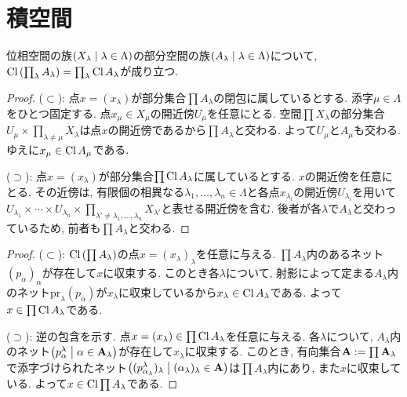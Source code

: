\documentclass[uplatex, dvipdfmx, a4paper, 12pt, class=jsbook, crop=false]{standalone}
\begin{document}
\section{積空間}
\label{sec:product-spaces}

\newcommand{\directedA}{\mathbf{A}} %
\newcommand{\proj}{\mathrm{pr}} %

\begin{proposition}
	\label{02b3a9}
	位相空間の族$\setfamily{X_\lambda}{\lambda \in \Lambda}$の部分空間の族$\setfamily{A_\lambda}{\lambda \in \Lambda}$について, $ \mathop{\mathrm{Cl}}\nolimits \left(\prod_\lambda A_\lambda\right) = \prod_\lambda \mathop{\mathrm{Cl}}\nolimits A_\lambda $が成り立つ.
\end{proposition}

\begin{proof}
	($\subset$):
	点$x = (x_\lambda)$が部分集合$\prod A_\lambda$の閉包に属しているとする.
	添字$\mu \in \Lambda$をひとつ固定する.
	点$x_\mu \in X_\mu$の開近傍$U_\mu$を任意にとる.
	空間$\prod X_\lambda$の部分集合$U_\mu \times \prod_{\lambda \neq \mu} X_{\lambda}$は点$x$の開近傍であるから$\prod A_{\lambda}$と交わる.
	よって$U_\mu$と$A_\mu$も交わる. ゆえに$x_\mu \in \mathop{\mathrm{Cl}}\nolimits A_\mu$である.

	($\supset$):
	点$x = (x_\lambda)$が部分集合$\prod \mathop{\mathrm{Cl}}\nolimits A_\lambda$に属しているとする.
	$x$の開近傍を任意にとる.
	その近傍は, 有限個の相異なる$\lambda_1, \ldots, \lambda_n \in \Lambda$と各点$x_{\lambda_i}$の開近傍$U_{\lambda_i}$を用いて$U_{\lambda_1} \times \cdots \times U_{\lambda_n} \times \prod_{\lambda' \neq \lambda_1, \ldots, \lambda_n} X_{\lambda'}$と表せる開近傍を含む.
	後者が各$\lambda$で$A_\lambda$と交わっているため, 前者も$\prod A_\lambda$と交わる.
\end{proof}

\begin{proof}
	($\subset$):
	$\mathop{\mathrm{Cl}}\nolimits \left(\prod A_\lambda\right)$の点$x = (x_\lambda)_\lambda$を任意に与える.
	$\prod A_\lambda$内のあるネット$(p_\alpha)_\alpha$が存在して$x$に収束する.
	このとき各$\lambda$について, 射影によって定まる$A_\lambda$内のネット$\proj_\lambda (p_\alpha)$が$x_\lambda$に収束しているから$x_\lambda \in \mathop{\mathrm{Cl}}\nolimits A_\lambda$である.
	よって$x \in \prod \mathop{\mathrm{Cl}}\nolimits A_\lambda$である.

	($\supset$):
	逆の包含を示す.
	点$x = (x_\lambda) \in \prod \mathop{\mathrm{Cl}}\nolimits A_\lambda$を任意に与える.
	各$\lambda$について, $A_\lambda$内のネット$\setfamily{p^\lambda_\alpha}{\alpha \in \directedA_\lambda}$が存在して$x_\lambda$に収束する.
	このとき, 有向集合$\directedA \defeq \prod \directedA_\lambda$で添字づけられたネット$\setfamily{(p^\lambda_{\alpha_\lambda})_\lambda}{(\alpha_\lambda)_\lambda \in \directedA}$は$\prod A_\lambda$内にあり, また$x$に収束している.
	よって$x \in \mathop{\mathrm{Cl}}\nolimits \prod A_\lambda$である.
\end{proof}
\end{document}
